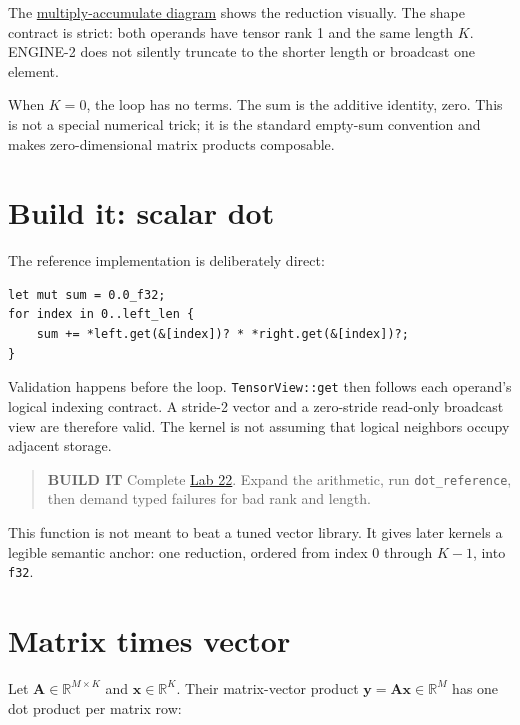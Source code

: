 The
\href{https://github.com/hermonai/inside-the-llm-engine/blob/astra-visual-rewrite/diagrams/linear/dot-product-multiply-accumulate.txt}{multiply-accumulate
diagram} shows the reduction visually. The shape contract is strict:
both operands have tensor rank 1 and the same length \(K\). ENGINE-2
does not silently truncate to the shorter length or broadcast one
element.

When \(K=0\), the loop has no terms. The sum is the additive identity,
zero. This is not a special numerical trick; it is the standard
empty-sum convention and makes zero-dimensional matrix products
composable.

\section{Build it: scalar dot}\label{build-it-scalar-dot}

The reference implementation is deliberately direct:

\begin{verbatim}
let mut sum = 0.0_f32;
for index in 0..left_len {
    sum += *left.get(&[index])? * *right.get(&[index])?;
}
\end{verbatim}

Validation happens before the loop. \texttt{TensorView::get} then
follows each operand's logical indexing contract. A stride-2 vector and
a zero-stride read-only broadcast view are therefore valid. The kernel
is not assuming that logical neighbors occupy adjacent storage.

\begin{quote}
\textbf{BUILD IT} Complete
\href{https://github.com/hermonai/inside-the-llm-engine/blob/astra-visual-rewrite/labs/lab-22-dot-product.md}{Lab
22}. Expand the arithmetic, run \texttt{dot\_reference}, then demand
typed failures for bad rank and length.
\end{quote}

This function is not meant to beat a tuned vector library. It gives
later kernels a legible semantic anchor: one reduction, ordered from
index 0 through \(K-1\), into \texttt{f32}.

\section{Matrix times vector}\label{matrix-times-vector}

Let \(\mathbf{A}\in\mathbb{R}^{M\times K}\) and
\(\mathbf{x}\in\mathbb{R}^{K}\). Their matrix-vector product
\(\mathbf{y}=\mathbf{A}\mathbf{x}\in\mathbb{R}^{M}\) has one dot product
per matrix row:

